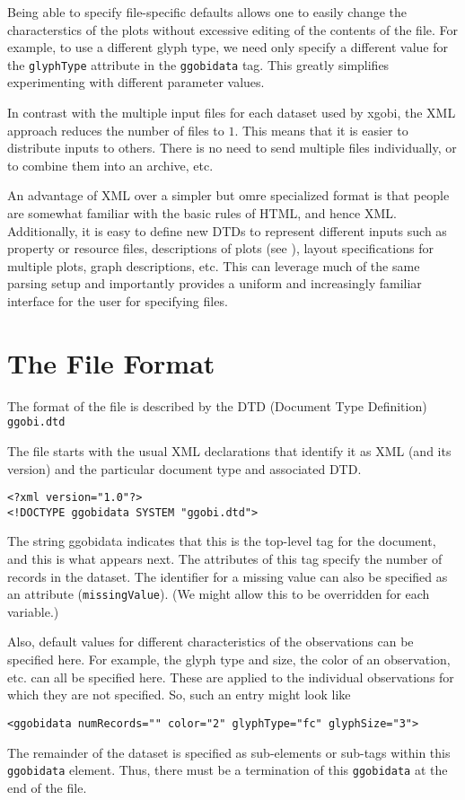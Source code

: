\documentclass{article}
\begin{document}
Being able to specify file-specific defaults allows one to easily
change the characterstics of the plots without excessive editing of
the contents of the file.  For example, to use a different glyph type,
we need only specify a different value for the \texttt{glyphType}
attribute in the \texttt{ggobidata} tag.  This greatly simplifies
experimenting with different parameter values.


In contrast with the multiple input files for each dataset used by
xgobi, the XML approach reduces the number of files to $1$. This means
that it is easier to distribute inputs to others. There is no need to
send multiple files individually, or to combine them into an archive,
etc.

An advantage of XML over a simpler but omre specialized format is that
people are somewhat familiar with the basic rules of HTML, and hence
XML. Additionally, it is easy to define new DTDs to represent
different inputs such as property or resource files, descriptions of
plots (see ), layout specifications for multiple plots,
graph descriptions, etc.  This can leverage much of the same parsing
setup and importantly provides a uniform and increasingly familiar
interface for the user for specifying files.




\section{The File Format}
The format of the file is described by the 
DTD (Document Type Definition) 
\texttt{ggobi.dtd}

The file starts with the usual XML
declarations that identify it as XML
(and its version)
and the particular document type
and associated DTD.
\begin{verbatim}
<?xml version="1.0"?>
<!DOCTYPE ggobidata SYSTEM "ggobi.dtd">
\end{verbatim}
The string ggobidata indicates that this is the top-level tag for the
document, and this is what appears next.  The attributes of this tag
specify the number of records in the dataset.  The identifier for a
missing value can also be specified as an attribute
(\texttt{missingValue}). (We might allow this to be overridden for
each variable.)

Also, default values for different characteristics of the observations
can be specified here.  For example, the glyph type and size, the
color of an observation, etc. can all be specified here.  These are
applied to the individual observations for which they are not
specified.  So, such an entry might look like
\begin{verbatim}
<ggobidata numRecords="" color="2" glyphType="fc" glyphSize="3">
\end{verbatim}
The remainder of the dataset is specified as sub-elements or sub-tags
within this \texttt{ggobidata} element.  Thus, there must be a
termination of this \texttt{ggobidata} at the end of the file.
\end{document}
